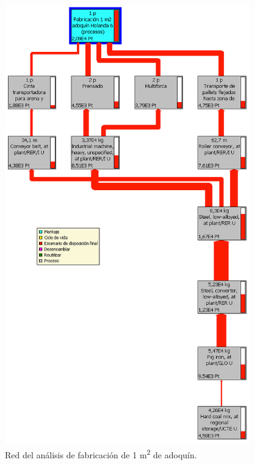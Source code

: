 \begin{figure}[!htb]
\centering
\includegraphics[height=19cm]{fabricacion_red.png}
\caption{Red del análisis de fabricación de 1 \si{m^2} de adoquín.}
\label{fig:redfabricacion}
\end{figure}
